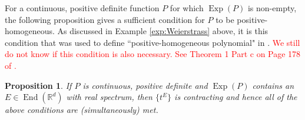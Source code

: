 \documentclass[11pt]{article}
\newtheorem{proposition}[theorem]{Proposition}
\newcommand\End{\operatorname{End}} %
\newcommand\Exp{\operatorname{Exp}}
\begin{document}
\noindent For a continuous, positive definite function $P$ for which $\Exp(P)$ is non-empty, the following proposition gives a sufficient condition for $P$ to be positive-homogeneous. As discussed in Example \ref{exp:Weierstrass} above, it is this condition that was used to define ``positive-homogeneous polynomial" in \cite{Randles2017}. \textcolor{red}{We still do not know if this condition is also necessary. See Theorem 1 Part c on Page 178 of \cite{Braun1993}.}



\begin{proposition}\label{prop:PosHomSufficientCondition}
If $P$ is continuous, positive definite and $\Exp(P)$ contains an $E\in\End(\mathbb{R}^d)$ with real spectrum, then $\{t^E\}$ is contracting and hence all of the above conditions are (simultaneously) met. 
\end{proposition}
\end{document}
